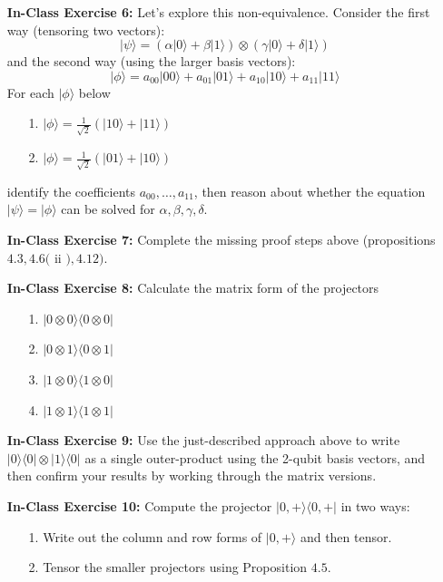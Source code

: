 \documentclass[main.tex]{subfiles}
\begin{document}
\begin{enumerate}
\item[] \textbf{In-Class Exercise 6:} Let's explore this non-equivalence. Consider the first way (tensoring two vectors):
$$|\psi\rangle=(\alpha|0\rangle+\beta|1\rangle) \otimes(\gamma|0\rangle+\delta|1\rangle)$$
and the second way (using the larger basis vectors):
$$|\phi\rangle=a_{00}|00\rangle+a_{01}|01\rangle+a_{10}|10\rangle+a_{11}|11\rangle$$
For each $|\phi\rangle$ below
\begin{enumerate}
    \item[1.]$|\phi\rangle=\frac{1}{\sqrt{2}}(|10\rangle+|11\rangle)$
    \item[2.]$|\phi\rangle=\frac{1}{\sqrt{2}}(|01\rangle+|10\rangle)$
\end{enumerate}
 identify the coefficients $a_{00}, \ldots, a_{11}$, then reason about whether the equation $|\psi\rangle=|\phi\rangle$ can be solved for $\alpha, \beta, \gamma, \delta$.

\item[] \textbf{In-Class Exercise 7:} Complete the missing proof steps above (propositions $4.3,4.6($ ii $), 4.12)$.

\item[] \textbf{In-Class Exercise 8:} Calculate the matrix form of the projectors
    \begin{enumerate}
        \item[1.] $|0 \otimes 0\rangle\langle 0 \otimes 0|$
        \item[2.] $|0 \otimes 1\rangle\langle 0 \otimes 1|$
        \item[3.] $|1 \otimes 0\rangle\langle 1 \otimes 0|$
        \item[4.] $|1 \otimes 1\rangle\langle 1 \otimes 1|$
    \end{enumerate}

\item[] \textbf{In-Class Exercise 9:} Use the just-described approach above to write $|0\rangle\langle 0|\otimes| 1\rangle\langle 0|$ as a single outer-product using the 2-qubit basis vectors, and then confirm your results by working through the matrix versions.

\item[] \textbf{In-Class Exercise 10:} Compute the projector $|0,+\rangle\langle 0,+|$ in two ways:
    \begin{enumerate}
        \item[1.] Write out the column and row forms of $|0,+\rangle$ and then tensor.
        \item[2.]  Tensor the smaller projectors using Proposition $4.5$.
    \end{enumerate}


\end{enumerate}
\end{document}
